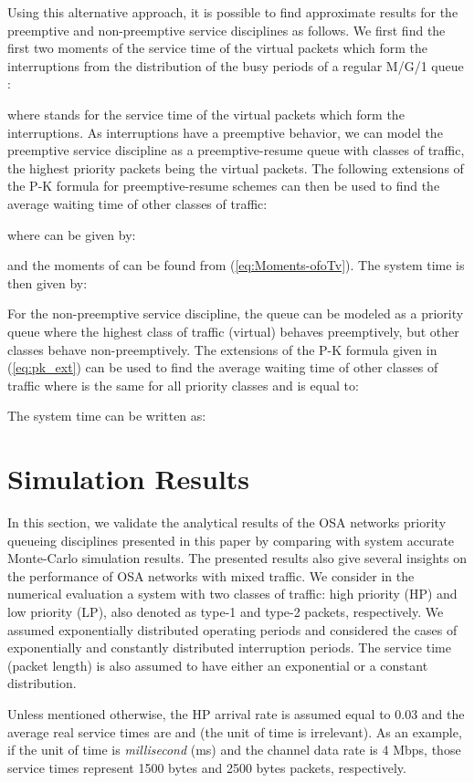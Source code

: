 \documentclass[11pt,journal,oneside,onecolumn,draftclsnofoot]{IEEEtran}
\begin{document}
Using this alternative approach, it is possible to find approximate results for the preemptive and non-preemptive service disciplines as follows.
We first find the first two moments of the service time of the virtual packets which form the interruptions from the distribution of the busy periods of a regular M/G/1 queue \cite{takagi91}: 


where  stands for the service time of the virtual packets which form the interruptions.
As interruptions have a preemptive behavior, we can model the preemptive service discipline as a preemptive-resume queue with  classes of traffic, the highest priority packets being the virtual packets.
The following extensions of the P-K formula for preemptive-resume schemes \cite{takagi91} can then be used to find the average waiting time of other classes of traffic:

where  can be given by:

and the moments of  can be found from (\ref{eq:Moments-ofoTv}).
The system time is then given by:


For the non-preemptive service discipline, the queue can be modeled as a priority queue where the highest class of traffic (virtual) behaves preemptively, but other classes behave non-preemptively.  The extensions of the P-K formula given in (\ref{eq:pk_ext}) can be used to find the average waiting time of other classes of traffic where  is the same for all priority classes and is equal to:

The system time can be written as: 


\section{Simulation Results}
\label{sec:sim-analysis}
In this section, we validate the analytical results of the OSA networks priority queueing disciplines presented in this paper by comparing with system accurate Monte-Carlo simulation results. The presented results also give several insights on the performance of OSA networks with mixed traffic.
We consider in the numerical evaluation a system with two classes of traffic: high priority (HP) and low priority (LP), also denoted as type-1 and type-2 packets, respectively. We assumed exponentially distributed operating periods and considered the cases of exponentially and constantly distributed interruption periods. 
The service time (packet length) is also assumed to have either an exponential or a constant distribution. 

Unless mentioned otherwise, the HP arrival rate is assumed  equal to 0.03 and the average real service times are  and  (the unit of time is irrelevant). As an example, if the unit of time is \emph{millisecond} (ms) and the channel data rate is 4 Mbps, those service times represent 1500 bytes and 2500 bytes packets, respectively.
\end{document}
